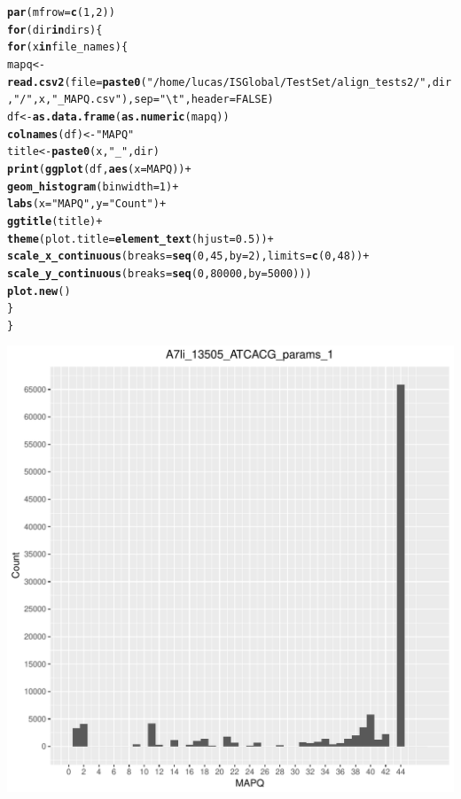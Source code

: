 \documentclass[12pt, a4paper]{article}\usepackage[]{graphicx}\usepackage[]{color}
\makeatletter
\newcommand{\hlnum}[1]{\textcolor[rgb]{0.686,0.059,0.569}{#1}}%
\newcommand{\hlstr}[1]{\textcolor[rgb]{0.192,0.494,0.8}{#1}}%
\newcommand{\hlopt}[1]{\textcolor[rgb]{0,0,0}{#1}}%
\newcommand{\hlstd}[1]{\textcolor[rgb]{0.345,0.345,0.345}{#1}}%
\newcommand{\hlkwa}[1]{\textcolor[rgb]{0.161,0.373,0.58}{\textbf{#1}}}%
\newcommand{\hlkwb}[1]{\textcolor[rgb]{0.69,0.353,0.396}{#1}}%
\newcommand{\hlkwc}[1]{\textcolor[rgb]{0.333,0.667,0.333}{#1}}%
\newcommand{\hlkwd}[1]{\textcolor[rgb]{0.737,0.353,0.396}{\textbf{#1}}}%
\newenvironment{kframe}{%
 \def\at@end@of@kframe{}%
 \ifinner\ifhmode%
  \def\at@end@of@kframe{\end{minipage}}%
  \begin{minipage}{\columnwidth}%
 \fi\fi%
 \def\FrameCommand##1{\hskip\@totalleftmargin \hskip-\fboxsep
 \colorbox{shadecolor}{##1}\hskip-\fboxsep
     \hskip-\linewidth \hskip-\@totalleftmargin \hskip\columnwidth}%
 \MakeFramed {\advance\hsize-\width
   \@totalleftmargin\z@ \linewidth\hsize
   \@setminipage}}%
 {\par\unskip\endMakeFramed%
 \at@end@of@kframe}
\makeatother
\begin{document}
\begin{kframe}
\begin{alltt}
\hlkwd{par}\hlstd{(}\hlkwc{mfrow} \hlstd{=} \hlkwd{c}\hlstd{(}\hlnum{1}\hlstd{,} \hlnum{2}\hlstd{))}
\hlkwa{for} \hlstd{(dir} \hlkwa{in} \hlstd{dirs)\{}
  \hlkwa{for} \hlstd{(x} \hlkwa{in} \hlstd{file_names)\{}
    \hlstd{mapq} \hlkwb{<-} \hlkwd{read.csv2}\hlstd{(}\hlkwc{file} \hlstd{=} \hlkwd{paste0}\hlstd{(}\hlstr{"/home/lucas/ISGlobal/TestSet/align_tests2/"}\hlstd{,dir,}\hlstr{"/"}\hlstd{,x,}\hlstr{"_MAPQ.csv"}\hlstd{),} \hlkwc{sep} \hlstd{=} \hlstr{"\textbackslash{}t"}\hlstd{,} \hlkwc{header} \hlstd{=} \hlnum{FALSE}\hlstd{)}
    \hlstd{df} \hlkwb{<-} \hlkwd{as.data.frame}\hlstd{(}\hlkwd{as.numeric}\hlstd{(mapq))}
    \hlkwd{colnames}\hlstd{(df)} \hlkwb{<-} \hlstr{"MAPQ"}
    \hlstd{title} \hlkwb{<-} \hlkwd{paste0}\hlstd{(x,}\hlstr{"_"}\hlstd{,dir)}
    \hlkwd{print}\hlstd{(}\hlkwd{ggplot}\hlstd{(df,} \hlkwd{aes}\hlstd{(}\hlkwc{x} \hlstd{= MAPQ))} \hlopt{+}
        \hlkwd{geom_histogram}\hlstd{(}\hlkwc{binwidth} \hlstd{=} \hlnum{1}\hlstd{)} \hlopt{+}
        \hlkwd{labs}\hlstd{(}\hlkwc{x} \hlstd{=} \hlstr{"MAPQ"}\hlstd{,} \hlkwc{y} \hlstd{=} \hlstr{"Count"}\hlstd{)} \hlopt{+}
        \hlkwd{ggtitle}\hlstd{(title)} \hlopt{+}
        \hlkwd{theme}\hlstd{(}\hlkwc{plot.title} \hlstd{=} \hlkwd{element_text}\hlstd{(}\hlkwc{hjust} \hlstd{=} \hlnum{0.5}\hlstd{))} \hlopt{+}
        \hlkwd{scale_x_continuous}\hlstd{(}\hlkwc{breaks} \hlstd{=} \hlkwd{seq}\hlstd{(}\hlnum{0}\hlstd{,} \hlnum{45}\hlstd{,} \hlkwc{by} \hlstd{=} \hlnum{2}\hlstd{),} \hlkwc{limits} \hlstd{=} \hlkwd{c}\hlstd{(}\hlnum{0}\hlstd{,}\hlnum{48}\hlstd{))} \hlopt{+}
        \hlkwd{scale_y_continuous}\hlstd{(}\hlkwc{breaks} \hlstd{=} \hlkwd{seq}\hlstd{(}\hlnum{0}\hlstd{,}\hlnum{80000}\hlstd{,} \hlkwc{by} \hlstd{=} \hlnum{5000}\hlstd{)))}
    \hlkwd{plot.new}\hlstd{()}
  \hlstd{\}}
\hlstd{\}}
\end{alltt}
\end{kframe}
\includegraphics[width=.5\linewidth,height=0.5\textheight]{figure/unnamed-chunk-3-1} 
\end{document}
